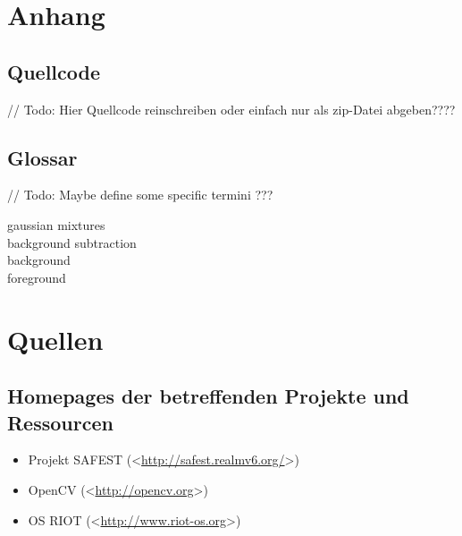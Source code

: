 \documentclass[10pt,a4paper]{article}
\begin{document}
\newpage
\section{Anhang}

\subsection{Quellcode}

// Todo: Hier Quellcode reinschreiben oder einfach nur als zip-Datei abgeben????

\subsection{Glossar}

// Todo: Maybe define some specific termini ???

gaussian mixtures \\
background subtraction \\
background \\
foreground \\


\newpage
\section{Quellen}

\subsection*{Homepages der betreffenden Projekte und Ressourcen}
\begin{itemize}
\item Projekt SAFEST (\textless\href{http://safest.realmv6.org/}{http://safest.realmv6.org/}\textgreater)
\item OpenCV (\textless\href{http://opencv.org}{http://opencv.org}\textgreater)
\item OS RIOT (\textless\href{http://www.riot-os.org}{http://www.riot-os.org}\textgreater)
\end{itemize}
\end{document}
